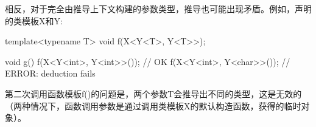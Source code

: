 相反，对于完全由推导上下文构建的参数类型，推导也可能出现矛盾。例如，声明的类模板X和Y:

\begin{cpp}
template<typename T>
void f(X<Y<T>, Y<T>>);

void g()
{
	f(X<Y<int>, Y<int>>()); // OK
	f(X<Y<int>, Y<char>>()); // ERROR: deduction fails
}
\end{cpp}

第二次调用函数模板f()的问题是，两个参数T会推导出不同的类型，这是无效的（两种情况下，函数调用参数是通过调用类模板X的默认构造函数，获得的临时对象）。

































